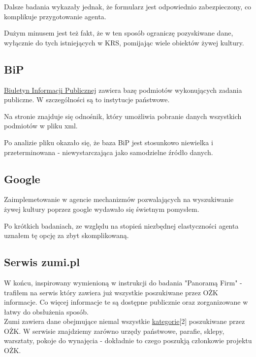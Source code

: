 \documentclass[a4 122pt]{article}
\begin{document}
				Dalsze badania wykazały jednak, że formularz jest odpowiednio zabezpieczony, co komplikuje przygotowanie agenta.
				
				Dużym minusem jest też fakt, że w ten sposób ograniczę pozyskiwane dane, wyłącznie do tych istniejących w KRS, pomijając wiele obiektów żywej kultury.
				
			\subsection{BiP}
			
				\href{http://www.bip.gov.pl/}{Biuletyn Informacji Publicznej} zawiera bazę podmiotów wykonujących zadania publiczne. 
				W szczególności są to instytucje państwowe.
				
				Na stronie znajduje się odnośnik, który umożliwia pobranie danych wszystkich podmiotów w pliku xml.
				
				Po analizie pliku okazało się, że baza BiP jest stosunkowo niewielka i przeterminowana - niewystarczająca jako samodzielne źródło danych. 
				
			\subsection{Google}
			
				Zaimplemetowanie w agencie mechanizmów pozwalających na wyszukiwanie żywej kultury poprzez google wydawało się świetnym pomysłem.
				
				Po krótkich badaniach, ze względu na stopień niezbędnej elastyczności agenta uznałem tę opcję za zbyt skomplikowaną.
			
			\subsection{Serwis zumi.pl}
			
				W końcu, inspirowany wymienioną w instrukcji do badania "Panoramą Firm" - trafiłem na serwis który zawiera już wszystkie poszukiwane przez OŻK informacje.
				Co więcej informacje te są dostępne publicznie oraz zorganizowane w łatwy do obsłużenia sposób.\\
				
				\noindent Zumi zawiera dane obejmujące niemal wszystkie \href{http://ozkultura.pl/node/1800}{kategorie}[2] poszukiwane przez OŻK.
				W serwisie znajdziemy zarówno urzędy państwowe, parafie, sklepy, warsztaty, pokoje do wynajęcia - dokładnie to czego poszukją członkowie projektu OŻK.\\
				
\end{document}
